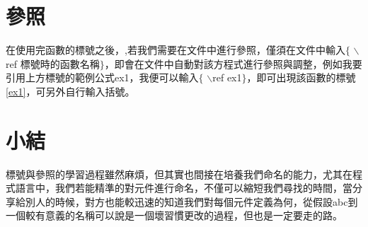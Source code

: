 \section{參照}
在使用完函數的標號之後，,若我們需要在文件中進行參照，僅須在文件中輸入$\{$ $\backslash$ref 標號時的函數名稱$\}$，即會在文件中自動對該方程式進行參照與調整，例如我要引用上方標號的範例公式ex1，我便可以輸入$\{$ $\backslash$ref ex1$\}$，即可出現該函數的標號{\ref{ex1}}，可另外自行輸入括號。\\
\section*{小結}
標號與參照的學習過程雖然麻煩，但其實也間接在培養我們命名的能力，尤其在程式語言中，我們若能精準的對元件進行命名，不僅可以縮短我們尋找的時間，當分享給別人的時候，對方也能較迅速的知道我們對每個元件定義為何，從假設abc到一個較有意義的名稱可以說是一個壞習慣更改的過程，但也是一定要走的路。


%
